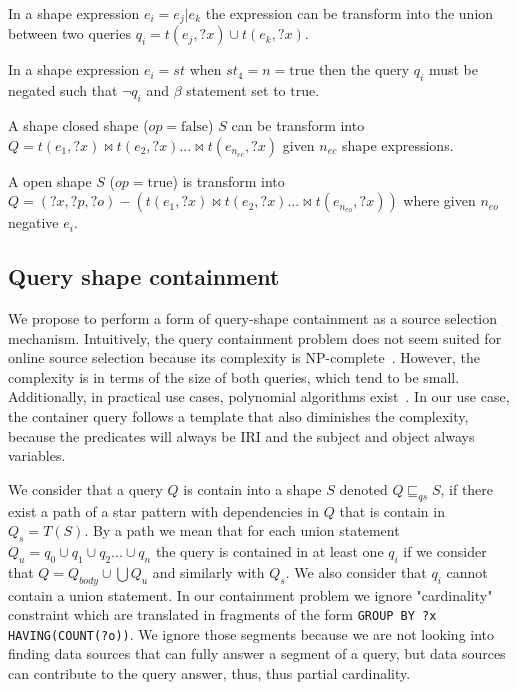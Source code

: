 \begin{prop}
   In a shape expression $e_i = e_j|e_k$ the expression can be transform into the union between two queries
   $q_{i} = t(e_j, ?x) \cup t(e_k, ?x)$.
\end{prop}

\begin{prop}
   In a shape expression $e_i = st$ when $st_4 = n = \mathrm{true}$ then the query $q_i$ must be negated such that $\neg q_i$ and $\beta$ statement set to $\mathrm{true}$.
\end{prop}

\begin{prop}
   A shape closed shape ($op = \mathrm{false}$) $S$ can be transform into $Q = t(e_1, ?x) \bowtie t(e_2, ?x) ... \bowtie t(e_{n_{ec}}, ?x)$ given $n_{ec}$ shape expressions.
\end{prop}

\begin{prop}
   A open shape $S$ ($op = \mathrm{true}$) is transform into $Q = (?x, ?p, ?o) -  (t(e_1, ?x) \bowtie  t(e_2, ?x) ... \bowtie t(e_{n_{eo}}, ?x)) $
   where given $n_{eo}$ negative $e_i$.
\end{prop}

\subsection{Query shape containment}\label{sec:containment}

We propose to perform a form of query-shape containment as a source selection mechanism.
Intuitively, the query containment problem does not seem suited for online source selection because its complexity is NP-complete~\cite{Spasi2023}.
However, the complexity is in terms of the size of both queries, which tend to be small.
Additionally, in practical use cases, polynomial algorithms exist~\cite{Doan2012}.
In our use case, the container query follows a template that also diminishes the complexity, because the predicates will always be 
IRI and the subject and object always variables.

We consider that a query $Q$ is contain into a shape $S$ denoted $Q \sqsubseteq_{qs} S$, if there exist a path of a star pattern with dependencies in $Q$ 
that is contain in $Q_s = T(S)$.
By a path we mean that for each union statement $Q_u = q_0 \cup q_1 \cup q_2 ... \cup q_n$ the query is contained in at least one $q_i$ if we 
consider that $Q = Q_{body} \cup \bigcup Q_u$ and similarly with $Q_s$.
We also consider that $q_i$ cannot contain a union statement.
In our containment problem we ignore "cardinality" constraint which are translated in 
fragments of the form \texttt{GROUP BY ?x HAVING(COUNT(?o))}.
We ignore those segments because we are not looking into finding data sources that can fully answer a segment of a query,
but data sources can contribute to the query answer, thus, thus partial cardinality.

